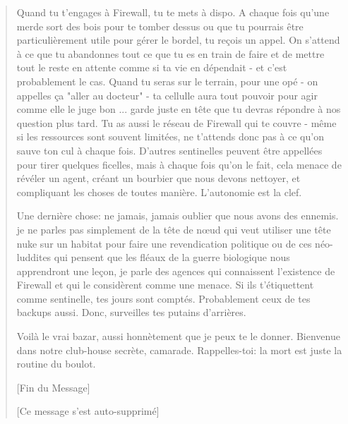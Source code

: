 \begin{quotation}
Quand tu t'engages à Firewall, tu te mets à dispo. A chaque fois qu'une merde sort des bois pour te tomber dessus ou que tu pourrais être particulièrement utile pour gérer le bordel, tu reçois un appel. On s'attend à ce que tu abandonnes tout ce que tu es en train de faire et de mettre tout le reste en attente comme si ta vie en dépendait - et c'est probablement le cas. Quand tu seras sur le terrain, pour une opé - on appelles ça "aller au docteur" - ta cellulle aura tout pouvoir pour agir comme elle le juge bon ... garde juste en tête que tu devras répondre à nos question plus tard. Tu as aussi le réseau de Firewall qui te couvre - même si les ressources sont souvent limitées, ne t'attends donc pas à ce qu'on sauve ton cul à chaque fois. D'autres sentinelles peuvent être appellées pour tirer quelques ficelles, mais à chaque fois qu'on le fait, cela menace de révéler un agent, créant un bourbier que nous devons nettoyer, et compliquant les choses de toutes manière. L'autonomie est la clef. 

Une dernière chose: ne jamais, jamais oublier que nous avons des ennemis. je ne parles pas simplement de la tête de nœud qui veut utiliser une tête nuke sur un habitat pour faire une revendication politique ou de ces néo-luddites qui pensent que les fléaux de la guerre biologique nous apprendront une leçon, je parle des agences qui connaissent l'existence de Firewall et qui le considèrent comme une menace. Si ils t'étiquettent comme sentinelle, tes jours sont comptés. Probablement ceux de tes backups aussi. Donc, surveilles tes putains d'arrières. 

Voilà le vrai bazar, aussi honnètement que je peux te le donner. Bienvenue dans notre club-house secrète, camarade. Rappelles-toi: la mort est juste la routine du boulot. 

[Fin du Message] 

[Ce message s'est auto-supprimé] \end{quotation} 



